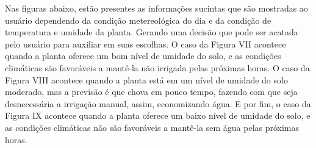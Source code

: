 \documentclass[eso]{bcc}
\begin{document}
Nas figuras abaixo, estão presentes as informações sucintas que são mostradas ao usuário dependendo 
da condição metereológica do dia e da condição de temperatura e umidade da planta. Gerando uma 
decisão que pode ser acatada pelo usuário para auxiliar em suas escolhas.	O caso da Figura VII 
acontece quando a planta oferece um bom nível de umidade do solo, e as condições climáticas são 
favoráveis a mantê-la não irrigada pelas próximas horas.	O caso da Figura VIII acontece quando a 
planta está em um nível de umidade do solo moderado, mas a previsão é que chova em pouco tempo, 
fazendo com que seja desnecessária a irrigação manual, assim, economizando água. E por fim, o caso 
da Figura IX acontece quando a planta oferece um baixo nível de umidade do solo, e as condições 
climáticas não são favoráveis a mantê-la sem água pelas próximas horas.
\end{document}
